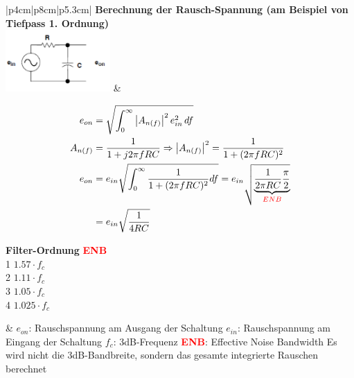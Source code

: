 \vspace{-2.5\topsep}
\begin{longtable}[t]{|p{4cm}|p{8cm}|p{5.3cm}|}
    \hline  
    \textbf{ Berechnung der Rausch-Spannung (am Beispiel von Tiefpass 1. Ordnung)}
    \\ \hdashline
    \includegraphics[width=4cm, valign=t]{pictures/RauschenTiefpass.png}
    & {\vspace{-1.5\topsep}
        \begin{align*}
            e_{on} &= \sqrt{\int_{0}^{\infty} \left| A_{n(f)}\right| ^2 e_{in}^2 \, df}\\
            A_{n(f)} &= \frac{1}{1+ j2\pi fRC} \Rightarrow \left| A_{n(f)}\right| ^2 = \frac{1}{1+(2\pi fRC)^2}\\
            e_{on} &= e_{in} \sqrt{\int_{0}^{\infty} \frac{1}{1 + (2\pi fRC)^2}df} = e_{in} \sqrt{\underbrace{\frac{1}{2\pi RC}\frac{\pi}{2}}_{\textcolor{red}{ENB}}}\\
            &= e_{in} \sqrt{\frac{1}{4RC}}
        \end{align*}
        \begin{tabbing}
            \textbf{ Filter-Ordnung}\qquad \= \textbf{ \textcolor{red}{ENB}}\\
            1 \> $1.57 \cdot f_c$\\
            2 \> $1.11 \cdot f_c$\\
            3 \> $1.05 \cdot f_c$\\
            4 \> $1.025 \cdot f_c$
        \end{tabbing}
      }
    & {\textbf{ $e_{on}$}: Rauschspannung am Ausgang der Schaltung\newline\newline
       \textbf{ $e_{in}$}: Rauschspannung am Eingang der Schaltung\newline\newline
       \textbf{ $f_c$}: 3dB-Frequenz \newline\newline
       \textbf{ \textcolor{red}{ENB}}: Effective Noise Bandwidth\newline
       Es wird nicht die 3dB-Bandbreite, sondern das gesamte integrierte Rauschen berechnet
      }
      \\
     \hline
\end{longtable}
